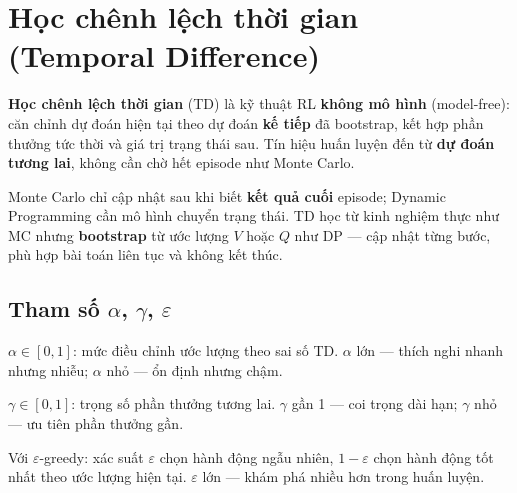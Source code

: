 \section{Học chênh lệch thời gian (Temporal Difference)}
\label{sec:temporal-difference}

\begin{dinhnghia}[title={Temporal Difference (TD) learning}]
\textbf{Học chênh lệch thời gian} (TD) là kỹ thuật RL \textbf{không mô hình} (model-free): căn chỉnh dự đoán hiện tại theo dự đoán \textbf{kế tiếp} đã bootstrap, kết hợp phần thưởng tức thời và giá trị trạng thái sau. Tín hiệu huấn luyện đến từ \textbf{dự đoán tương lai}, không cần chờ hết episode như Monte Carlo.
\end{dinhnghia}

\begin{ynghia}[title={Vị trí giữa MC và DP}]
Monte Carlo chỉ cập nhật sau khi biết \textbf{kết quả cuối} episode; Dynamic Programming cần mô hình chuyển trạng thái. TD học từ kinh nghiệm thực như MC nhưng \textbf{bootstrap} từ ước lượng $V$ hoặc $Q$ như DP --- cập nhật từng bước, phù hợp bài toán liên tục và không kết thúc.
\end{ynghia}

\subsection{Tham số $\alpha$, $\gamma$, $\varepsilon$}

\begin{dinhnghia}[title={$\alpha$ --- tốc độ học}]
$\alpha \in [0,1]$: mức điều chỉnh ước lượng theo sai số TD. $\alpha$ lớn --- thích nghi nhanh nhưng nhiễu; $\alpha$ nhỏ --- ổn định nhưng chậm.
\end{dinhnghia}

\begin{dinhnghia}[title={$\gamma$ --- hệ số chiết khấu}]
$\gamma \in [0,1]$: trọng số phần thưởng tương lai. $\gamma$ gần 1 --- coi trọng dài hạn; $\gamma$ nhỏ --- ưu tiên phần thưởng gần.
\end{dinhnghia}

\begin{dinhnghia}[title={$\varepsilon$ --- khám phá}]
Với $\varepsilon$-greedy: xác suất $\varepsilon$ chọn hành động ngẫu nhiên, $1-\varepsilon$ chọn hành động tốt nhất theo ước lượng hiện tại. $\varepsilon$ lớn --- khám phá nhiều hơn trong huấn luyện.
\end{dinhnghia}

